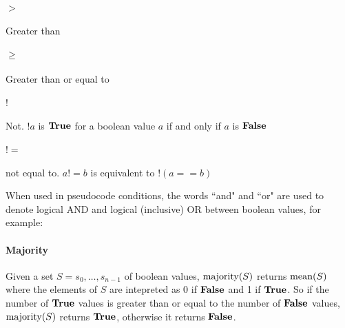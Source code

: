 \paragraph*{$>$}	Greater than

\paragraph*{$\geq$} Greater than or equal to

\paragraph*{$!$} Not. $!a$ is $\text{\bf{True}}$ for a boolean value $a$ if and only if $a$ is $\text{\bf{False}}$

\paragraph*{$!=$} not equal to. $a!=b$ is equivalent to $!(a==b)$

When used in pseudocode conditions, the words ``and" and ``or" are used to denote logical AND
and logical (inclusive) OR between boolean values, for example:

\begin{pseudo*}
    \bsCODE{\hdots}
\bsEND
\end{pseudo*}

\paragraph*{Majority} Given a set $S=s_0, \hdots, s_{n-1}$ of boolean values, $\operatorname{majority}(S)$ 
returns $\operatorname{mean}(S)$ where the elements of $S$ are intepreted as $0$ if $\text{\bf{False}}$ and 1 if $\text{\bf{True}}$.
So if the number of $\text{\bf{True}}$ values is greater than or equal to the number of $\text{\bf{False}}$ values, $\operatorname{majority}(S)$ returns
$\text{\bf{True}}$, otherwise it returns $\text{\bf{False}}$.
